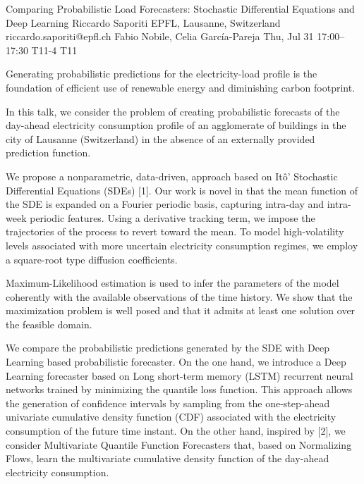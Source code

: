 \documentclass[12pt,lettersize,oneside]{book} %
\begin{document}
\begin{talk}
  {Comparing Probabilistic Load Forecasters: Stochastic Differential Equations and Deep Learning}%
  {Riccardo Saporiti}%
  {EPFL, Lausanne, Switzerland}%
  {riccardo.saporiti@epfl.ch}%
  {Fabio Nobile, Celia Garc\'ia-Pareja}%
  {}%
  {Thu, Jul 31 17:00--17:30}%
  {T11-4}%
  {T11}%
  
    

Generating probabilistic predictions for the electricity-load profile is the foundation of efficient use of renewable energy and diminishing carbon footprint.

In this talk, we consider the problem of creating probabilistic forecasts of the day-ahead electricity consumption profile of an agglomerate of buildings in the city of Lausanne (Switzerland) in the absence of an externally provided prediction function. 
 
We propose a nonparametric, data-driven, approach based on It\^o' Stochastic Differential Equations (SDEs) [1]. Our work is novel in that the mean function of the SDE is expanded on a Fourier periodic basis, capturing intra-day and intra-week periodic features. 
Using a derivative tracking term, we impose the trajectories of the process to revert toward the mean. To model high-volatility levels associated with more uncertain electricity consumption regimes, we employ a square-root type diffusion coefficients. 

Maximum-Likelihood estimation is used to infer the parameters of the model coherently with the available observations of the time history. We show that the maximization problem is well posed and that it admits at least one solution over the feasible domain. 

We compare the probabilistic predictions generated by the SDE with Deep Learning based probabilistic forecaster. 
On the one hand, we introduce a Deep Learning forecaster based on Long short-term memory (LSTM) recurrent neural networks trained by minimizing the quantile loss function. This approach allows the generation of confidence intervals by sampling from the one-step-ahead univariate cumulative density function (CDF) associated with the electricity consumption of the future time instant. 
On the other hand, inspired by [2], we consider Multivariate Quantile Function Forecasters that, based on Normalizing Flows, learn the multivariate cumulative density function of the day-ahead electricity consumption.


\end{talk}
\end{document}
